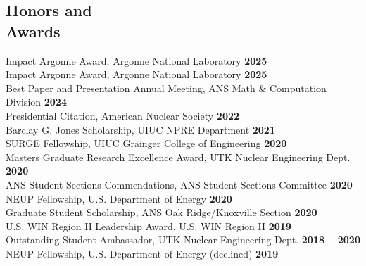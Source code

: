 \documentclass[margin,line]{resume}
\begin{document}
\begin{resume}
    \section{\mysidestyle Honors and\\Awards}
        Impact Argonne Award, Argonne National Laboratory \hfill \textbf{2025}\vspace{0.5mm}\\
        Impact Argonne Award, Argonne National Laboratory \hfill \textbf{2025}\vspace{0.5mm}\\
        Best Paper and Presentation Annual Meeting, ANS Math \& Computation Division \hfill \textbf{2024}\vspace{0.5mm}\\
        Presidential Citation, American Nuclear Society \hfill \textbf{2022}\vspace{.5mm}\\
        Barclay G. Jones Scholarship, UIUC NPRE Department \hfill \textbf{2021}\vspace{0.5mm}\\
        SURGE Fellowship, UIUC Grainger College of Engineering \hfill \textbf{2020}\vspace{0.5mm}\\
        Masters Graduate Research Excellence Award, UTK Nuclear Engineering Dept. \hfill \textbf{2020}\vspace{.5mm}\\%
        ANS Student Sections Commendations, ANS Student Sections Committee \hfill \textbf{2020}\vspace{.5mm}\\%
        NEUP Fellowship, U.S. Department of Energy \hfill \textbf{2020}\vspace{0.5mm}\\
        Graduate Student Scholarship, ANS Oak Ridge/Knoxville Section \hfill \textbf{2020}\vspace{0.5mm}\\
        U.S. WIN Region II Leadership Award, U.S. WIN Region II \hfill \textbf{2019}\vspace{.5mm}\\%
        Outstanding Student Ambassador, UTK Nuclear Engineering Dept. \hfill \textbf{2018 -- 2020}\vspace{.5mm}\\%
        NEUP Fellowship, U.S. Department of Energy (declined) \hfill \textbf{2019}\vspace{0.5mm}\\

\end{resume}
\end{document}
